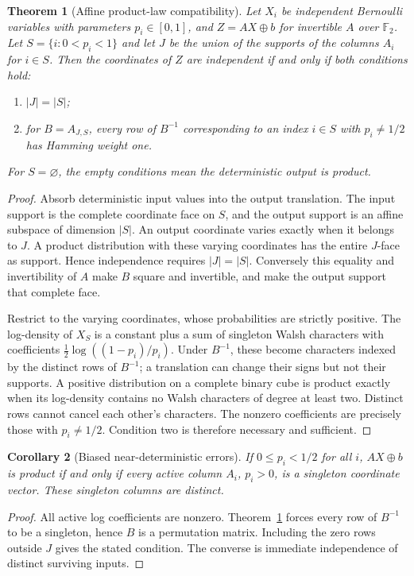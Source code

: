 \documentclass[11pt]{article}
\newtheorem{theorem}{Theorem}
\newtheorem{corollary}[theorem]{Corollary}
\theoremstyle{definition}\newtheorem{definition}[theorem]{Definition}
\theoremstyle{remark}\newtheorem{remark}[theorem]{Remark}
\newcommand{\F}{\mathbb F_2}
\begin{document}
\begin{theorem}[Affine product-law compatibility]\label{thm:affine}
Let $X_i$ be independent Bernoulli variables with parameters $p_i\in[0,1]$, and $Z=AX\oplus b$ for invertible $A$ over $\F$. Let $S=\{i:0<p_i<1\}$ and let $J$ be the union of the supports of the columns $A_i$ for $i\in S$. Then the coordinates of $Z$ are independent if and only if both conditions hold:
\begin{enumerate}
\item $|J|=|S|$;
\item for $B=A_{J,S}$, every row of $B^{-1}$ corresponding to an index $i\in S$ with $p_i\ne1/2$ has Hamming weight one.
\end{enumerate}
For $S=\varnothing$, the empty conditions mean the deterministic output is product.
\end{theorem}
\begin{proof}
Absorb deterministic input values into the output translation. The input support is the complete coordinate face on $S$, and the output support is an affine subspace of dimension $|S|$. An output coordinate varies exactly when it belongs to $J$. A product distribution with these varying coordinates has the entire $J$-face as support. Hence independence requires $|J|=|S|$. Conversely this equality and invertibility of $A$ make $B$ square and invertible, and make the output support that complete face.

Restrict to the varying coordinates, whose probabilities are strictly positive. The log-density of $X_S$ is a constant plus a sum of singleton Walsh characters with coefficients $\frac12\log((1-p_i)/p_i)$. Under $B^{-1}$, these become characters indexed by the distinct rows of $B^{-1}$; a translation can change their signs but not their supports. A positive distribution on a complete binary cube is product exactly when its log-density contains no Walsh characters of degree at least two. Distinct rows cannot cancel each other's characters. The nonzero coefficients are precisely those with $p_i\ne1/2$. Condition two is therefore necessary and sufficient.
\end{proof}

\begin{corollary}[Biased near-deterministic errors]\label{cor:small}
If $0\le p_i<1/2$ for all $i$, $AX\oplus b$ is product if and only if every active column $A_i$, $p_i>0$, is a singleton coordinate vector. These singleton columns are distinct.
\end{corollary}
\begin{proof}
All active log coefficients are nonzero. Theorem~\ref{thm:affine} forces every row of $B^{-1}$ to be a singleton, hence $B$ is a permutation matrix. Including the zero rows outside $J$ gives the stated condition. The converse is immediate independence of distinct surviving inputs.
\end{proof}
\end{document}

